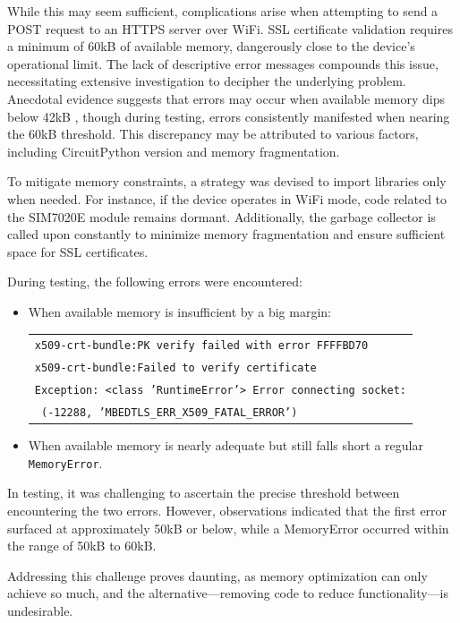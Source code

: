 While this may seem sufficient, complications arise when attempting to send a POST request to an 
HTTPS server over WiFi. SSL certificate validation requires a minimum of 60kB of available memory, 
dangerously close to the device's operational limit. The lack of descriptive error messages 
compounds this issue, necessitating extensive investigation to decipher the underlying problem. 
Anecdotal evidence suggests that errors may occur when available memory dips below 42kB 
\cite{ssl_memoryerror}, though during testing, errors consistently manifested when nearing the 60kB 
threshold. This discrepancy may be attributed to various factors, including CircuitPython version 
and memory fragmentation.

To mitigate memory constraints, a strategy was devised to import libraries only when needed. For 
instance, if the device operates in WiFi mode, code related to the SIM7020E module remains dormant. 
Additionally, the garbage collector is called upon constantly to minimize memory fragmentation and 
ensure sufficient space for SSL certificates.

During testing, the following errors were encountered:

\begin{itemize}
	\item When available memory is insufficient by a big margin:
	
	\begin{tabular}{l}
		\texttt{x509-crt-bundle:PK verify failed with error FFFFBD70} \\
		\texttt{x509-crt-bundle:Failed to verify certificate} \\
		\texttt{Exception: <class 'RuntimeError'> Error connecting socket:} \\
		\texttt{ (-12288, 'MBEDTLS\_ERR\_X509\_FATAL\_ERROR')}
	\end{tabular}

	\item When available memory is nearly adequate but still falls short a regular\\ 
	\texttt{MemoryError}.
\end{itemize}

In testing, it was challenging to ascertain the precise threshold between encountering the two 
errors. However, observations indicated that the first error surfaced at approximately 50kB or 
below, while a MemoryError occurred within the range of 50kB to 60kB.

Addressing this challenge proves daunting, as memory optimization can only achieve so much, and the 
alternative—removing code to reduce functionality—is undesirable.

